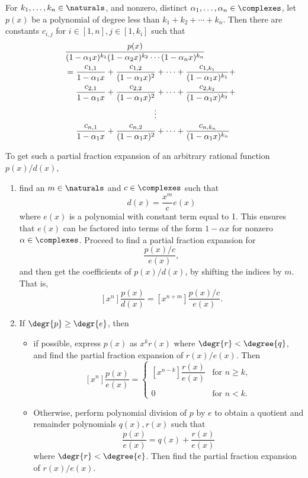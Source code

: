 \documentclass[handout]{mcs}
\begin{document}

\begin{lemma*}\label{lem:partial-fraction-distinct-roots-handout}
For $k_1,\dots, k_n \in \naturals$, and nonzero, distinct $\alpha_1,
\dots, \alpha_n \in \complexes$, let $p(x)$ be a polynomial of degree
less than $k_1+k_2+\cdots +k_n$.  Then there are constants $c_{i,j}$
for $i \in [1,n], j\in [1,k_i]$ such that
\begin{align*}
\lefteqn{\frac{p(x)}{(1-\alpha_1 x)^{k_1}(1-\alpha_2 x)^{k_2}\cdots(1-\alpha_n x)^{k_n}}}\\
& = \frac{c_{1,1}}{1-\alpha_1 x} + \frac{c_{1,2}}{(1-\alpha_1 x)^2} + \cdots + \frac{c_{1,k_1}}{(1-\alpha_1 x)^{k_1}} +\\
& \quad\ \frac{c_{2,1}}{1-\alpha_1 x} + \frac{c_{2,2}}{(1-\alpha_1 x)^2} + \cdots + \frac{c_{2,k_2}}{(1-\alpha_1 x)^{k_2}} +\\
& \hspace{1.5in} \vdots\\
& \quad\ \frac{c_{n,1}}{1-\alpha_1 x} + \frac{c_{n,2}}{(1-\alpha_1 x)^2} + \cdots + \frac{c_{n,k_n}}{(1-\alpha_1 x)^{k_n}}
\end{align*}
\end{lemma*}

To get such a partial fraction expansion of an arbitrary rational
function $p(x)/d(x)$,
\begin{enumerate}

\item find an $m \in \naturals$ and $c \in \complexes$ such that
\[
d(x) = \frac{x^m}{c} e(x)
\]
where $e(x)$ is a polynomial with constant term equal to 1.  This
ensures that $e(x)$ can be factored into terms of the form $1-\alpha
x$ for nonzero $\alpha \in \complexes$.  Proceed to find a partial
fraction expansion for
\[
\frac{p(x)/c}{e(x)},
\]
and then get the coefficients of $p(x)/d(x)$, by shifting the indices by $m$.  That is,
\[
[x^n]\frac{p(x)}{d(x)} = [x^{n+m}]\frac{p(x)/c}{e(x)}.
\]

\item If $\degr{p} \geq \degr{e}$, then
\begin{itemize}

\item if possible, express $p(x)$ as $x^k r(x)$ where $\degr{r} <
  \degree{q}$, and find the partial fraction expansion of $r(x)/e(x)$.
  Then
\[
[x^n]\frac{p(x)}{e(x)} =
    \begin{cases}
         [x^{n-k}]\dfrac{r(x)}{e(x)} & \text{for } n \geq k,\\
\\

          0                        & \text{for } n < k.
\end{cases}
\]

\item Otherwise, perform polynomial division of $p$ by $e$ to obtain a
  quotient and remainder polynomials $q(x), r(x)$ such that
\[
\frac{p(x)}{e(x)} = q(x) + \frac{r(x)}{e(x)}
\]
where $\degr{r} < \degree{e}$.  Then find the partial fraction
expansion of $r(x)/e(x)$.
\end{itemize}
\end{enumerate}
\end{document}
